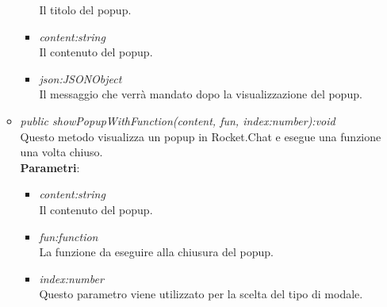 \begin{itemize}
\begin{itemize}
\begin{itemize}
				Il titolo del popup.
				\item \textit{content:string}\\
				Il contenuto del popup.
				\item \textit{json:JSONObject}\\
				Il messaggio che verrà mandato dopo la visualizzazione del popup.
			\end{itemize}
	\item \textit{public showPopupWithFunction(content, fun, index:number):void}\\
	Questo metodo visualizza un popup in Rocket.Chat e esegue una funzione una volta chiuso.
			\\ \textbf{Parametri}: \begin{itemize}
				\item \textit{content:string}\\
				Il contenuto del popup.
				\item \textit{fun:function}\\
				La funzione da eseguire alla chiusura del popup.
				\item \textit{index:number}\\
				Questo parametro viene utilizzato per la scelta del tipo di modale.
			\end{itemize}
	\end{itemize}
\end{itemize}